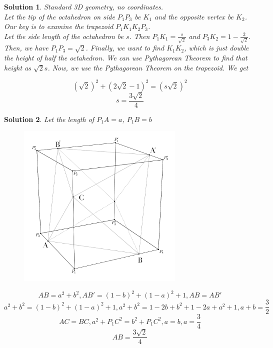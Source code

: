 \documentclass[12pt]{article}
\newtheorem{solution}{Solution}
\begin{document}
\begin{solution}
Standard 3D geometry, no coordinates. \\ 


Let the tip of the octahedron on side $P_1P_3$ be $K_1$ and the opposite vertex be $K_2$. Our key is to examine the trapezoid $P_1K_1K_2P_3$. \\ 


Let the side length of the octahedron be $s$. Then $P_1K_1 = \frac{s}{\sqrt{2}}$ and $P_3K_2 = 1 - \frac{2}{\sqrt{2}}$. Then, we have $P_1P_3 = \sqrt{2}$. Finally, we want to find $K_1K_2$, which is just double the height of half the octahedron. We can use Pythagorean Theorem to find that height as $\sqrt{2}s$. Now, we use the Pythagorean Theorem on the trapezoid. We get

$$(\sqrt{2})^2 + (2\sqrt{2}-1)^2 = (s\sqrt{2})^2$$ $$s = \frac{3\sqrt{2}}{4}$$

\end{solution}

\begin{solution}



Let the length of $P_1A = a$, $P_1B = b$
\begin{figure}[H]
        \centering
        \includegraphics[width=8cm]{3.png}
        \label{fig:assertion-3}
\end{figure}
$$AB = a^2 + b^2, AB' = (1-b)^2 + (1-a)^2 + 1, AB = AB'$$
$$a^2 + b^2 = (1-b)^2 + (1-a)^2 + 1, a^2 + b^2 = 1 - 2b + b^2 + 1 - 2a + a^2 + 1, a+ b = \frac32$$
$$AC = BC, a^2 + P_1C^2 = b^2 + P_1C^2, a = b, a = \frac34$$
$$AB = \boxed{\frac{3\sqrt{2}}{4}}$$
\end{solution}

\vspace{2.3in}
\end{document}
